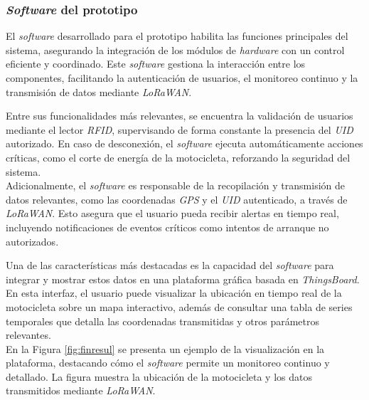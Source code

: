 \subsubsection{\textit{Software} del prototipo}

El \textit{software} desarrollado para el prototipo habilita las funciones principales del sistema, asegurando la integración de los módulos de \textit{hardware} con un control eficiente y coordinado. Este \textit{software} gestiona la interacción entre los componentes, facilitando la autenticación de usuarios, el monitoreo continuo y la transmisión de datos mediante \textit{LoRaWAN}.

Entre sus funcionalidades más relevantes, se encuentra la validación de usuarios mediante el lector \textit{RFID}, supervisando de forma constante la presencia del \textit{UID} autorizado. En caso de desconexión, el \textit{software} ejecuta automáticamente acciones críticas, como el corte de energía de la motocicleta, reforzando la seguridad del sistema.\\

Adicionalmente, el \textit{software} es responsable de la recopilación y transmisión de datos relevantes, como las coordenadas \textit{GPS} y el \textit{UID} autenticado, a través de \textit{LoRaWAN}. Esto asegura que el usuario pueda recibir alertas en tiempo real, incluyendo notificaciones de eventos críticos como intentos de arranque no autorizados.

Una de las características más destacadas es la capacidad del \textit{software} para integrar y mostrar estos datos en una plataforma gráfica basada en \textit{ThingsBoard}. En esta interfaz, el usuario puede visualizar la ubicación en tiempo real de la motocicleta sobre un mapa interactivo, además de consultar una tabla de series temporales que detalla las coordenadas transmitidas y otros parámetros relevantes.\\

En la Figura \ref{fig:finresul} se presenta un ejemplo de la visualización en la plataforma, destacando cómo el \textit{software} permite un monitoreo continuo y detallado. La figura muestra la ubicación de la motocicleta y los datos transmitidos mediante \textit{LoRaWAN}.

